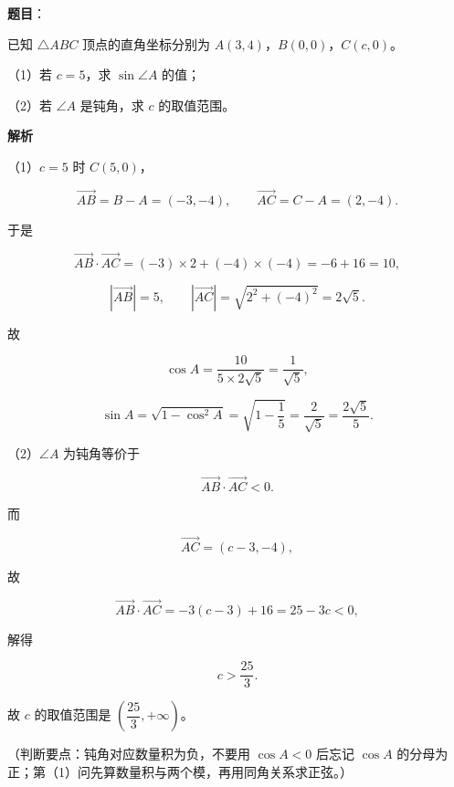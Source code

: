 \begin{answer}

\textbf{题目}：

已知 $\triangle ABC$ 顶点的直角坐标分别为 $A(3,4)$，$B(0,0)$，$C(c,0)$。

（1）若 $c=5$，求 $\sin\angle A$ 的值；

（2）若 $\angle A$ 是钝角，求 $c$ 的取值范围。

\textbf{解析}

（1）$c=5$ 时 $C(5,0)$，

\nopagebreak[4]
\[\overrightarrow{AB}=B-A=(-3,-4),\qquad \overrightarrow{AC}=C-A=(2,-4).\]

于是

\nopagebreak[4]
\[\overrightarrow{AB}\cdot\overrightarrow{AC}=(-3)\times2+(-4)\times(-4)=-6+16=10,\]

\nopagebreak[4]
\[|\overrightarrow{AB}|=5,\qquad |\overrightarrow{AC}|=\sqrt{2^2+(-4)^2}=2\sqrt5.\]

故

\nopagebreak[4]
\[\cos A=\frac{10}{5\times2\sqrt5}=\frac1{\sqrt5},\]

\nopagebreak[4]
\[\sin A=\sqrt{1-\cos^2A}=\sqrt{1-\frac15}=\frac{2}{\sqrt5}=\frac{2\sqrt5}{5}.\]

（2）$\angle A$ 为钝角等价于

\nopagebreak[4]
\[\overrightarrow{AB}\cdot\overrightarrow{AC}<0.\]

而

\nopagebreak[4]
\[\overrightarrow{AC}=(c-3,-4),\]

故

\nopagebreak[4]
\[\overrightarrow{AB}\cdot\overrightarrow{AC}=-3(c-3)+16=25-3c<0,\]

解得

\nopagebreak[4]
\[c>\frac{25}{3}.\]

故 $c$ 的取值范围是 $\left(\dfrac{25}{3},+\infty\right)$。

（判断要点：钝角对应数量积为负，不要用 $\cos A<0$ 后忘记 $\cos A$ 的分母为正；第（1）问先算数量积与两个模，再用同角关系求正弦。）


\end{answer}
